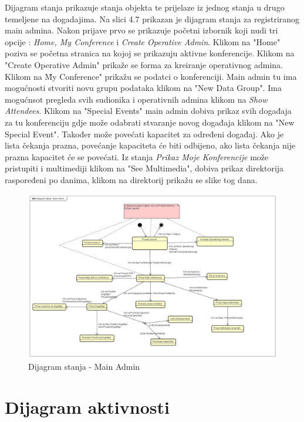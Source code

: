 			
Dijagram stanja prikazuje stanja objekta te prijelaze iz jednog stanja u drugo temeljene na dogadajima. Na slici 4.7 prikazan je dijagram stanja za registriranog main admina. Nakon prijave prvo se prikazuje početni izbornik koji nudi tri opcije : \textit{Home, My Conference} i \textit{Create Operative Admin}. Klikom na "Home" poziva se početna stranica na kojoj se prikazuju aktivne konferencije. Klikom na "Create Operative Admin" prikaže se forma za kreiranje operativnog admina. Klikom na \"My Conference" prikažu se podatci o konferenciji. Main admin tu ima mogućnosti stvoriti novu grupu podataka klikom na "New Data Group". Ima mogućnsot pregleda svih sudionika i operativnih admina klikom na \textit{Show Attendees}. Klikom na "Special Events" main admin dobiva prikaz svih događaja za tu konferenciju gdje može odabrati stvaranje novog događaja klikom na "New Special Event". Također može povećati kapacitet za određeni događaj. Ako je lista čekanja prazna, povećanje kapaciteta će biti odbijeno, ako lista čekanja nije prazna kapacitet će se povećati. Iz stanja \textit{Prikaz Moje Konferencije} može pristupiti i multimediji klikom na "See Multimedia", dobiva prikaz direktorija raspoređeni po danima, klikom na direktorij prikažu se slike tog dana.

                \begin{figure}[H]
			\includegraphics[width = \textwidth]{slike/Dijagram stanja - Main Admin.jpg}
			\centering
			\caption{Dijagram stanja - Main Admin}
			\label{fig:dijagram-stanja-main-admin}
			\end{figure}
			
			
			\eject 
		
			\section{Dijagram aktivnosti}
			

